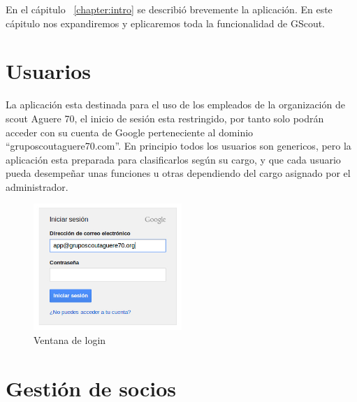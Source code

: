 


En el cápitulo ~\ref{chapter:intro} se describió brevemente la aplicación. En este cápitulo nos expandiremos y eplicaremos toda la funcionalidad de GScout.

\section{Usuarios}
\label{3:sec1}

La aplicación esta destinada para el uso de los empleados de la organización de scout Aguere 70, el inicio de sesión esta restringido, por tanto solo podrán 
acceder con su cuenta de Google perteneciente al dominio ``gruposcoutaguere70.com''. En principio todos los usuarios son genericos, pero la aplicación esta preparada
para clasificarlos según su cargo, y que cada usuario pueda desempeñar unas funciones u otras dependiendo del cargo asignado por el administrador.\\


\begin{figure}[H]
\begin{center}
\includegraphics[width=0.5\textwidth]{images/login.jpg}
\caption{Ventana de login}
\label{fig:ArbolBinario}
\end{center}
\end{figure}


\section{Gestión de socios}
\label{3:sec2}

